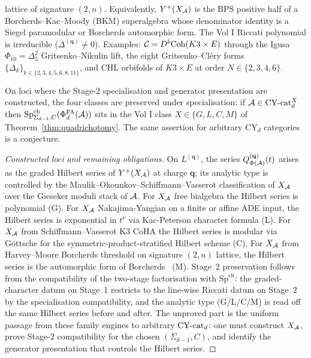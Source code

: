 \begin{theorem}
\begin{enumerate}[label=\textup{(\roman*)}]
  lattice of signature $(2, n)$. Equivalently, $Y^{+}(X_{\mathcal{A}})$ is
  the BPS positive half of a Borcherds--Kac--Moody (BKM) superalgebra
  whose denominator identity is a Siegel paramodular or Borcherds
  automorphic form. The Vol I Riccati polynomial is irreducible
  ($\Delta^{(\mathbf q)} \neq 0$). Examples: $\mathcal{C} = D^{b}\mathrm{Coh}(K3 \times E)$
  through the Igusa $\Phi_{10} = \Delta_{5}^{2}$ Gritsenko--Nikulin
  lift, the eight Gritsenko--Cl\'ery forms $\{\Delta_{k}\}_{k \in
  \{2,3,4,5,6,8,11\}}$, and CHL orbifolds of $K3 \times E$ at order
  $N \in \{2, 3, 4, 6\}$.
\end{enumerate}
On loci where the Stage-$2$ specialisation and generator presentation
are constructed, the four classes are preserved under specialisation:
if $\mathcal{A} \in \mathrm{CY}\text{-}\mathrm{cat}_{d}^{X}$ then
$\mathrm{Sp}^{\mathrm{ch}}_{\Sigma_{d-1},C}(\Phi^{\mathrm{FA}}_{d}(\mathcal{A}))$ sits in the Vol I class
$X \in \{G, L, C, M\}$ of Theorem~\ref{thm:quadrichotomy}.
The same assertion for arbitrary CY$_d$ categories is a conjecture.
\end{theorem}

\begin{proof}[Constructed loci and remaining obligations]
On $L^{(\mathbf q)}$, the series $Q^{(\mathbf q)}_{\Phi(\mathcal{A})}(t)$
arises as the graded Hilbert series of $Y^{+}(X_{\mathcal{A}})$ at charge
$\mathbf q$; its analytic type is controlled by the
Maulik--Okounkov--Schiffmann--Vasserot classification of $X_{\mathcal{A}}$
over the Gieseker moduli stack of $\mathcal{A}$. For $X_{\mathcal{A}}$ free bialgebra
the Hilbert series is polynomial (G). For $X_{\mathcal{A}}$ Nakajima-Yangian
on a finite or affine ADE input, the Hilbert series is exponential in
$t^{\nu}$ via Kac-Peterson character formula (L). For $X_{\mathcal{A}}$ from
Schiffmann--Vasserot K3 CoHA the Hilbert series is modular via
G\"ottsche for the symmetric-product-stratified Hilbert scheme (C).
For $X_{\mathcal{A}}$ from Harvey--Moore Borcherds threshold on signature
$(2, n)$ lattice, the Hilbert series is the automorphic form of
Borcherds~\cite{Borcherds1995} (M). Stage~2 preservation follows from
the compatibility of the two-stage factorisation with
$\mathrm{Sp}^{\mathrm{ch}}$: the graded-character datum on Stage~1
restricts to the line-wise Riccati datum on Stage~2 by the
specialisation compatibility, and the analytic type (G/L/C/M) is read
off the same Hilbert series before and after. The unproved part is the
uniform passage from these family engines to arbitrary $\mathrm{CY}\text{-}\mathrm{cat}_d$:
one must construct $X_{\mathcal{A}}$, prove Stage-$2$ compatibility for the
chosen $(\Sigma_{d-1},C)$, and identify the generator presentation
that controls the Hilbert series.
\end{proof}


